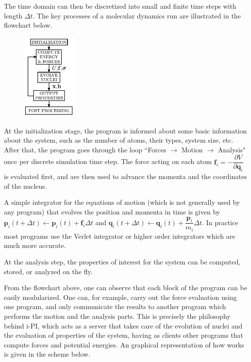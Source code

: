 \documentclass{article}
\begin{document}
\begin{Exercise}[label={i-pi},title={Molecular Dynamics: a client/server approach}]
The time domain can then be discretized into small  and finite time steps with length $\Delta t$.
The key processes of a molecular dynamics run are illustrated in the flowchart below.
\begin{figure}[h]
    \begin{center}
    \includegraphics[width=0.25\textwidth]{mdchart.pdf}
    \end{center}
\end{figure}
At the initialization stage, the program is informed about some basic information about the system,
such as the number of atoms, their types, system size, etc.
After that, the program goes through the loop ``Forces $\rightarrow$ Motion $\rightarrow$ Analysis" once per discrete simulation time step.
The force acting on each atom $\textbf{f}_i=-\dfrac{\partial V}{\partial \textbf{q}_i}$ is evaluated first,
and are then used to advance the momenta and the coordinates of the nucleus. 

A simple integrator for the equations of motion (which is not generally used by any program) that
evolves the position and momenta in time is given by
$\textbf{p}_i(t+\Delta t)\leftarrow \textbf{p}_i(t)+\textbf{f}_i \Delta t$ and 
$\textbf{q}_i(t+\Delta t)\leftarrow \textbf{q}_i(t)+\dfrac{\textbf{p}_i}{m_i} \Delta t$. In practice most
programs use the Verlet integrator or higher order integrators which are much more accurate.

At the analysis step, the properties of interest for the system can be computed, stored, or analyzed on the fly.

From the flowchart above, one can observe that each block of the program can be easily modularized.
One can, for example, carry out the force evaluation using one program,
and only communicate the results to another program which performs the motion and the analysis parts.
This is precisely the philosophy behind i-PI,
which acts as a server that takes care of the evolution of nuclei and the evaluation of
properties of the system, having as clients other programs that compute forces and potential energies.
An graphical representation of how \ipi{} works is given in the scheme below.


\end{Exercise}
\end{document}
